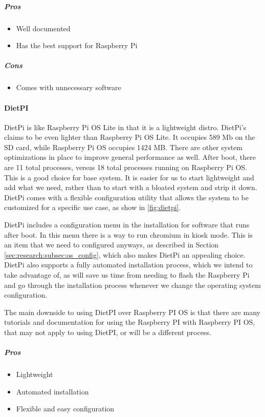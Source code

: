 \subparagraph{Pros}
\begin{itemize}
  \item Well documented
  \item Has the best support for Raspberry Pi
\end{itemize}

\subparagraph{Cons}
\begin{itemize}
  \item Comes with unnecessary software
\end{itemize}

\paragraph{DietPI}

DietPi is like Raspberry Pi OS Lite in that it is a lightweight distro. DietPi's claims to
be even lighter than Raspberry Pi OS Lite. It occupies 589 Mb on the SD card, while
Raspberry Pi OS occupies 1424 MB. There are other system optimizations in place to improve
general performance as well. After boot, there are 11 total processes, versus 18 total
processes running on Raspberry Pi OS. This is a good choice for base system. It is easier
for us to start lightweight and add what we need, rather than to start with a bloated
system and strip it down. DietPi comes with a flexible configuration utility that allows
the system to be customized for a specific use case, as show in \autoref{fig:dietpi}.

DietPi includes a configuration menu in the installation for software that runs after
boot. In this menu there is a way to run chromium in kiosk mode. This is an item that we
need to configured anyways, as described in Section \ref{sec:research:subsec:os_config},
which also makes DietPi an appealing choice. DietPi also supports a fully automated
installation process, which we intend to take advantage of, as will save us time from
needing to flash the Raspberry Pi and go through the installation process whenever we
change the operating system configuration.

The main downside to using DietPI over Raspberry PI OS is that there are many tutorials
and documentation for using the Raspberry PI with Raspberry PI OS, that may not apply to
using DietPI, or will be a different process.

\subparagraph{Pros}
\begin{itemize}
  \item Lightweight
  \item Automated installation
  \item Flexible and easy configuration
\end{itemize}

